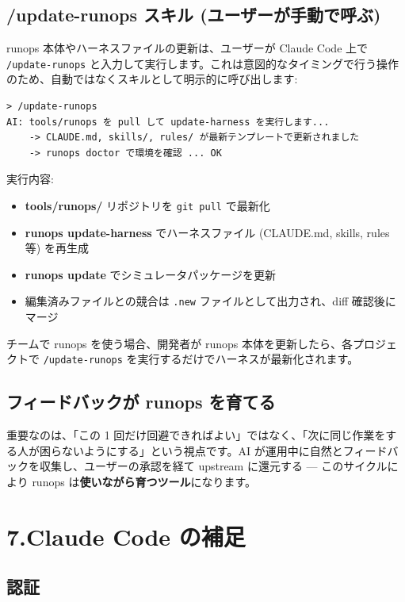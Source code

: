 \documentclass[a4paper,11pt]{article}
\begin{document}
\subsection*{\color{accent} /update-runops スキル (ユーザーが手動で呼ぶ)}

runops 本体やハーネスファイルの更新は、ユーザーが Claude Code 上で \texttt{/update-runops} と入力して実行します。これは意図的なタイミングで行う操作のため、自動ではなくスキルとして明示的に呼び出します:

\begin{lstlisting}[language={},commentstyle={}]
> /update-runops
AI: tools/runops を pull して update-harness を実行します...
    -> CLAUDE.md, skills/, rules/ が最新テンプレートで更新されました
    -> runops doctor で環境を確認 ... OK
\end{lstlisting}

実行内容:
\begin{itemize}[nosep]
  \item \textbf{tools/runops/} リポジトリを \texttt{git pull} で最新化
  \item \textbf{runops update-harness} でハーネスファイル (CLAUDE.md, skills, rules 等) を再生成
  \item \textbf{runops update} でシミュレータパッケージを更新
  \item 編集済みファイルとの競合は \texttt{.new} ファイルとして出力され、diff 確認後にマージ
\end{itemize}

チームで runops を使う場合、開発者が runops 本体を更新したら、各プロジェクトで \texttt{/update-runops} を実行するだけでハーネスが最新化されます。

\subsection*{\color{accent} フィードバックが runops を育てる}

重要なのは、「この 1 回だけ回避できればよい」ではなく、「次に同じ作業をする人が困らないようにする」という視点です。AI が運用中に自然とフィードバックを収集し、ユーザーの承認を経て upstream に還元する --- このサイクルにより runops は\textbf{使いながら育つツール}になります。

\section*{\color{darkblue} 7.\quad Claude Code の補足}

\subsection*{\color{accent} 認証}
\end{document}
